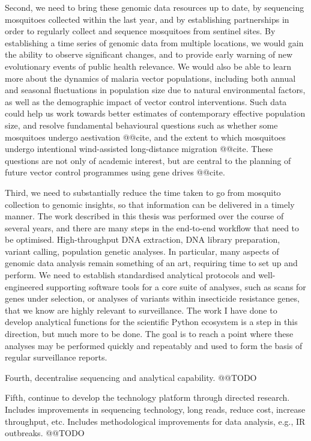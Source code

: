 \documentclass[a4paper,11pt,abstracton,hidelinks]{scrartcl}
\begin{document}
Second, we need to bring these genomic data resources up to date, by sequencing mosquitoes collected within the last year, and by establishing partnerships in order to regularly collect and sequence mosquitoes from sentinel sites.
%
By establishing a time series of genomic data from multiple locations, we would gain the ability to observe significant changes, and to provide early warning of new evolutionary events of public health relevance.
%
We would also be able to learn more about the dynamics of malaria vector populations, including both annual and seasonal fluctuations in population size due to natural environmental factors, as well as the demographic impact of vector control interventions.
%
Such data could help us work towards better estimates of contemporary effective population size, and resolve fundamental behavioural questions such as whether some mosquitoes undergo aestivation @@cite, and the extent to which mosquitoes undergo intentional wind-assisted long-distance migration @@cite.
%
These questions are not only of academic interest, but are central to the planning of future vector control programmes using gene drives @@cite.


Third, we need to substantially reduce the time taken to go from mosquito collection to genomic insights, so that information can be delivered in a timely manner.
%
The work described in this thesis was performed over the course of several years, and there are many steps in the end-to-end workflow that need to be optimised.
%
High-throughput DNA extraction, DNA library preparation, variant calling, population genetic analyses.
%
In particular, many aspects of genomic data analysis remain something of an art, requiring time to set up and perform.
%
We need to establish standardised analytical protocols and well-engineered supporting software tools for a core suite of analyses, such as scans for genes under selection, or analyses of variants within insecticide resistance genes, that we know are highly relevant to surveillance.
%
The work I have done to develop analytical functions for the scientific Python ecosystem is a step in this direction, but much more to be done.
%
The goal is to reach a point where these analyses may be performed quickly and repeatably and used to form the basis of regular surveillance reports.


Fourth, decentralise sequencing and analytical capability.
%
@@TODO


Fifth, continue to develop the technology platform through directed research.
%
Includes improvements in sequencing technology, long reads, reduce cost, increase throughput, etc.
%
Includes methodological improvements for data analysis, e.g., IR outbreaks.
%
@@TODO
\end{document}
